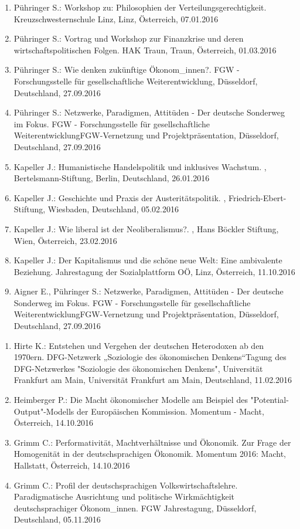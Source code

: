 \begin{enumerate}
	\item Pühringer S.: Workshop zu: Philosophien der Verteilungsgerechtigkeit. Kreuzschwesternschule Linz, Linz, Österreich, 07.01.2016
	\item Pühringer S.: Vortrag und Workshop zur Finanzkrise und deren wirtschaftspolitischen Folgen. HAK Traun, Traun, Österreich, 01.03.2016
	\item Pühringer S.: Wie denken zukünftige Ökonom\_innen?. FGW - Forschungsstelle für gesellschaftliche Weiterentwicklung, Düsseldorf, Deutschland, 27.09.2016
	\item Pühringer S.: Netzwerke, Paradigmen, Attitüden - Der deutsche Sonderweg im Fokus. FGW - Forschungsstelle für gesellschaftliche WeiterentwicklungFGW-Vernetzung und Projektpräsentation, Düsseldorf, Deutschland, 27.09.2016
	\item Kapeller J.: Humanistische Handelspolitik und inklusives Wachstum. , Bertelsmann-Stiftung, Berlin, Deutschland, 26.01.2016
	\item Kapeller J.: Geschichte und Praxis der Austeritätspolitik. , Friedrich-Ebert-Stiftung, Wiesbaden, Deutschland, 05.02.2016
	\item Kapeller J.: Wie liberal ist der Neoliberalismus?. , Hans Böckler Stiftung, Wien, Österreich, 23.02.2016
	\item Kapeller J.: Der Kapitalismus und die schöne neue Welt: Eine ambivalente Beziehung. Jahrestagung der Sozialplattform OÖ, Linz, Österreich, 11.10.2016
	\item Aigner E., Pühringer S.: Netzwerke, Paradigmen, Attitüden - Der deutsche Sonderweg im Fokus. FGW - Forschungsstelle für gesellschaftliche WeiterentwicklungFGW-Vernetzung und Projektpräsentation, Düsseldorf, Deutschland, 27.09.2016
\end{enumerate}

\begin{enumerate}
	\item Hirte K.: Entstehen und Vergehen der deutschen Heterodoxen ab den 1970ern. DFG-Netzwerk „Soziologie des ökonomischen Denkens“Tagung des DFG-Netzwerkes "Soziologie des ökonomischen Denkens", Universität Frankfurt am Main, Universität Frankfurt am Main, Deutschland, 11.02.2016
	\item Heimberger P.: Die Macht ökonomischer Modelle am Beispiel des "Potential-Output"-Modells der Europäischen Kommission. Momentum - Macht, Österreich, 14.10.2016
	\item Grimm C.: Performativität, Machtverhältnisse und Ökonomik. Zur Frage der Homogenität in der deutschsprachigen Ökonomik. Momentum 2016: Macht, Hallstatt, Österreich, 14.10.2016
	\item Grimm C.: Profil der deutschsprachigen Volkswirtschaftslehre. Paradigmatische Ausrichtung und politische Wirkmächtigkeit deutschsprachiger Ökonom\_innen. FGW Jahrestagung, Düsseldorf, Deutschland, 05.11.2016
\end{enumerate}

